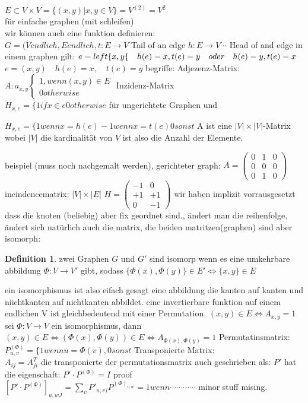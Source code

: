 \documentclass[a4paper]{article}
\theoremstyle{definition}
\newtheorem{definition}{Definition}
\theoremstyle{remark}
\begin{document}
$E\subset V\times V= \{(x,y)|x,y\in V\}= V^{(2)}=V^2$\\
für einfache graphen (mit schleifen)\\
wir können auch eine funktion definieren:\\
$G=(V endlich, E endlich, t: E\rightarrow V$ Tail of an edge
  $h:E\rightarrow V \cdots$ Head of and edge
  in einem graphen gilt:
  $e=\\left\{ x,y \{ \quad h(e)=x, t(e)=y\quad oder \quad h(e)=y, t(e)=x$
  $e=(x,y)\quad h(e)=x, \quad t(e)=y$
begriffe:
Adjezenz-Matrix:\\
$A: a_{x,y}
\begin{cases}
 	1, wenn (x,y)\in E\\
	0 otherwise
\end{cases}
$
Inzidenz-Matrix\\
$H_{x,e}= \{ 1 if x\in e
  		0 otherwise
		$
für ungerichtete Graphen und 

$H_{x,e}=\{ 1 wenn x=h(e)
  		-1 wenn x=t(e)
		0 sonst$
A ist eine $|V|\times|V|$-Matrix
wobei $|V|$ die kardinalität von $V$ ist also die Anzahl der Elemente.

beispiel (muss noch nachgemalt werden), gerichteter graph:
  $A= \begin{pmatrix}
  0&1&0\\0&0&0\\0&1&0
  \end{pmatrix}
$
incindencematrix: $|V|\times|E|$
$H= \begin{pmatrix}
-1&0\\+1&+1\\0&-1
\end{pmatrix}$
wir haben implizit vorrausgesetzt dass die knoten (beliebig) aber fix geordnet sind., ändert man die reihenfolge, ändert sich natürlich auch die matrix, die beiden matritzen(graphen) sind aber isomorph:\\
\begin{definition}
  
  zwei Graphen $G$ und $G'$ sind isomorp wenn es eine umkehrbare abbildung $\Phi:V\rightarrow V'$ gibt, sodass $\{\Phi (x),\Phi (y)\}\in E' \Leftrightarrow \{x,y\} \in E $
\end{definition}
ein isomorphismus ist also eifach gesagt eine abbildung die kanten auf kanten und niichtkanten auf nichtkanten abbildet.
eine invertierbare funktion auf einem endlichen V ist gleichbedeutend mit einer Permutation.
$(x,y)\in E \Leftrightarrow A_{x,y}=1$
sei $\Phi:V\rightarrow V$ ein isomorphismus, dann\\
$(x,y)\in E \Leftrightarrow (\Phi (x),\Phi (y))\in E \Leftrightarrow A_{\Phi (x),\Phi (y)}=1$
Permutatinsmatrix:
$P^{(\Phi )}_{u,v}=\{ 1 wenn u=\Phi (v), 0 sonst$
Transponierte Matrix:\\
$A_{ij}=A^{T}_{ji}$
die transponierte der permutationsmatrix auch geschrieben als: 
$P'$ hat die eigenschaft:
$P'\cdot P^{(\Phi )}=I$ 
proof\\
$[P'\cdot P^{(\Phi )}]_{u,wJ}= \sum_{v} P'_{u,v)}P^{(\Phi )_{v,w}}= 1 wenn \cdots\cdots\cdots\cdots$
minor stuff mising.
\end{document}
